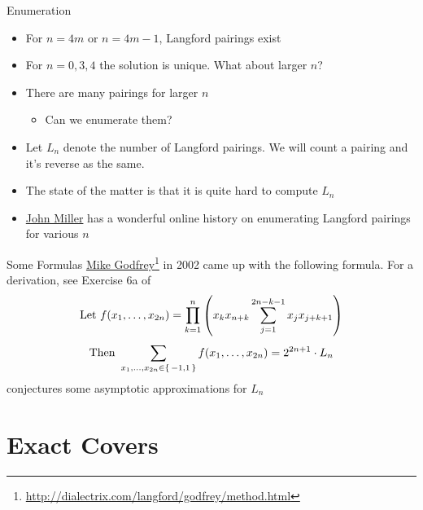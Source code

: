 \documentclass[aspectratio=169, handout]{beamer}
\begin{document}
\begin{frame}{Enumeration}
    \begin{itemize}
        \item For $n = 4m$ or $n = 4m - 1$, Langford pairings exist
        \item For $n = 0, 3, 4$ the solution is unique. What about larger $n$? \pause
        \item There are many pairings for larger $n$
        \begin{itemize}
            \item Can we \textcolor{sigma@mainblue}{enumerate} them?
        \end{itemize} \pause
        \item Let $L_n$ denote the number of Langford pairings. We will count a pairing and it's reverse as the same. 
        \item The state of the matter is that it is quite hard to compute $L_n$ \pause
                \item \href{http://dialectrix.com/langford.html}{\textcolor{sigma@mainblue}{John Miller}} has a wonderful online history on enumerating Langford pairings for various $n$
    \end{itemize}
\end{frame}

\begin{frame}{Some Formulas}
    \href{http://dialectrix.com/langford/godfrey/method.html}{\textcolor{sigma@mainblue}{Mike Godfrey}}\footnote{\href{http://dialectrix.com/langford/godfrey/method.html}{\textcolor{sigma@mainblue}{http://dialectrix.com/langford/godfrey/method.html}}} in 2002 came up with the following formula. For a derivation, see \textcolor{sigma@alertred}{Exercise 6a of \cite[Chapter~7]{TAOCP4A}}\pause
    \begin{equation*}
        \text{Let } f(x_1, \ldots, x_{2n}) = \prod_{k = 1}^n \pqty{x_k x_{n + k} \sum_{j = 1}^{2n - k - 1} x_j x_{j + k + 1}}
    \end{equation*}
    \begin{equation*}
        \text{Then } \sum_{x_1, \ldots, x_{2n} \in \set{-1, 1}} f(x_1, \ldots, x_{2n}) = 2^{2n + 1} \cdot L_n
    \end{equation*}\pause
    \cite{LangfordAsymptotic} conjectures some asymptotic approximations for $L_n$
\end{frame}

\section{Exact Covers}
\frame{\sectionpage}
\end{document}
